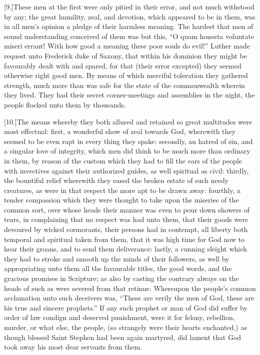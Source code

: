 [9.]These men at the first were only pitied in their error, and not much withstood by any; the great humility, zeal, and devotion, which appeared to be in them, was in all men’s opinion a pledge of their harmless meaning. The hardest that men of sound understanding conceived of them was but this, “O quam honesta voluntate miseri errant! With how good a meaning these poor souls do evil!” Luther made request unto Frederick duke of Saxony, that within his dominion they might be favourably dealt with and spared, for that (their error excepted) they seemed otherwise right good men. By means of which merciful toleration they gathered strength, much more than was safe for the state of the commonwealth wherein they lived. They had their secret corner-meetings and assemblies in the night, the people flocked unto them by thousands.

[10.]The means whereby they both allured and retained so great multitudes were most effectual: first, a wonderful show of zeal towards God, wherewith they seemed to be even rapt in every thing they spake: secondly, an hatred of sin, and a singular love of integrity, which men did think to be much more than ordinary in them, by reason of the custom which they had to fill the ears of the people with invectives against their authorized guides, as well spiritual as civil: thirdly, the bountiful relief wherewith they eased the broken estate of such needy creatures, as were in that respect the more apt to be drawn away: fourthly, a tender compassion which they were thought to take upon the miseries of the common sort, over whose heads their manner was even to pour down showers of tears, in complaining that no respect was had unto them, that their goods were devoured by wicked cormorants, their persons had in contempt, all liberty both temporal and spiritual taken from them, that it was high time for God now to hear their groans, and to send them deliverance: lastly, a cunning sleight which they had to stroke and smooth up the minds of their followers, as well by appropriating unto them all the favourable titles, the good words, and the gracious promises in Scripture; as also by casting the contrary always on the heads of such as were severed from that retinue. Whereupon the people’s common acclamation unto such deceivers was, “These are verily the men of God, these are his true and sincere prophets.” If any such prophet or man of God did suffer by order of law condign and deserved punishment, were it for felony, rebellion, murder, or what else, the people, (so strangely were their hearts enchanted,) as though blessed Saint Stephen had been again martyred, did lament that God took away his most dear servants from them.

